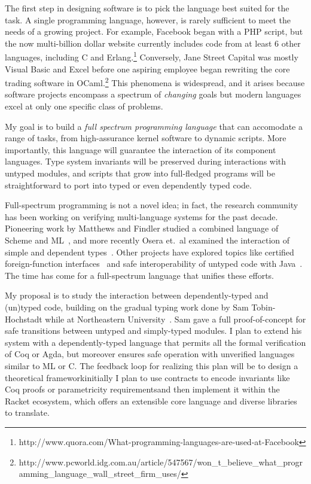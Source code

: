 \documentclass[12pt]{article}
\newcommand{\hdr}[2]{\vspace{-0.4cm}{\flushleft{\hrulefill\\\textbf{#1}\hfill{#2}\\\vspace{-0.2cm}\hrulefill}}\vspace{0.1cm}}
\begin{document}
\hdr{DRAFT: NSF Research Proposal}{Ben Greenman}

The first step in designing software is to pick the language best suited for the task.
A single programming language, however, is rarely sufficient to meet the needs of a growing project.
For example, Facebook began with a PHP script, but the now multi-billion dollar website currently includes code from at least 6 other languages, including C and Erlang.\footnote{http://www.quora.com/What-programming-languages-are-used-at-Facebook}
Conversely, Jane Street Capital was mostly Visual Basic and Excel before one aspiring employee began rewriting the core trading software in OCaml.\footnote{http://www.pcworld.idg.com.au/article/547567/won\_t\_believe\_what\_programming\_language\_wall\_street\_firm\_uses/}
This phenomena is widespread, and it arises because software projects encompass a spectrum of \emph{changing} goals but modern languages excel at only one specific class of problems.

My goal is to build a \emph{full spectrum programming language} that can accomodate a range of tasks, from high-assurance kernel software to dynamic scripts.
More importantly, this language will guarantee the interaction of its component languages.
Type system invariants will be preserved during interactions with untyped modules, and scripts that grow into full-fledged programs will be straightforward to port into typed or even dependently typed code.

\hdr{Research Proposal}{}

Full-spectrum programming is not a novel idea; in fact, the research community has been working on verifying multi-language systems for the past decade.
Pioneering work by Matthews and Findler studied a combined language of Scheme and ML~\cite{matthews2007operational}, and more recently Osera et.~al examined the interaction of simple and dependent types~\cite{osera}.
Other projects have explored topics like certified foreign-function interfaces~\cite{furr2005checking} and safe interoperability of untyped code with Java~\cite{gray2005fine}.
The time has come for a full-spectrum language that unifies these efforts.

My proposal is to study the interaction between dependently-typed and (un)typed code, building on the gradual typing work done by Sam Tobin-Hochstadt while at Northeastern University~\cite{tobin2010typed}.
Sam gave a full proof-of-concept for safe transitions between untyped and simply-typed modules.
I plan to extend his system with a dependently-typed language that permits all the formal verification of Coq or Agda, but moreover ensures safe operation with unverified languages similar to ML or C.
The feedback loop for realizing this plan will be to design a theoretical framework\textemdash initially I plan to use contracts to encode invariants like Coq proofs or parametricity requirements\textemdash and then implement it within the Racket ecosystem, which offers an extensible core language and diverse libraries to translate.
\end{document}
